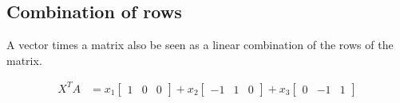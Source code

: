 \subsection{Combination of rows}
A vector times a matrix also be seen as a linear combination of the rows of the matrix.

\begin{align*}
	X^TA & = x_1 \begin{bmatrix} 1 & 0 & 0 \end{bmatrix}
	+ x_2 \begin{bmatrix} -1 & 1 & 0 \end{bmatrix}
	+ x_3 \begin{bmatrix} 0 & -1 & 1 \end{bmatrix}
\end{align*}
